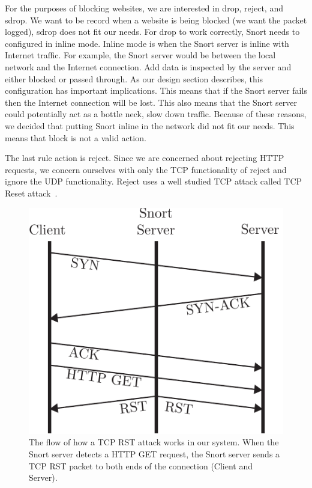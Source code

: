 For the purposes of blocking websites, we are interested in drop, reject, and
sdrop. We want to be record when a website is being blocked (we want the packet
logged), sdrop does not fit our needs. For drop to work correctly, Snort needs
to configured in inline mode. Inline mode is when the Snort server is inline
with Internet traffic. For example, the Snort server would be between the local
network and the Internet connection. Add data is inspected by the server and
either blocked or passed through. As our design section describes, this
configuration has important implications. This means that if the Snort server
fails then the Internet connection will be lost. This also means that the Snort
server could potentially act as a bottle neck, slow down traffic. Because of
these reasons, we decided that putting Snort inline in the network did not fit
our needs. This means that block is not a valid action.

The last rule action is reject. Since we are concerned about rejecting HTTP
requests, we concern ourselves with only the TCP functionality of reject and
ignore the UDP functionality. Reject uses a well studied TCP attack called TCP
Reset attack~\cite{watson2004slipping}.

\begin{figure}[!t]
    \centering
    \includegraphics[width=.8\columnwidth]{figures/tcp_reset}
    \caption{The flow of how a TCP RST attack works in our system. When the
    Snort server detects a HTTP GET request, the Snort server sends a TCP RST
    packet to both ends of the connection (Client and Server).}
    \label{fig:tcp_reset}
\end{figure}

